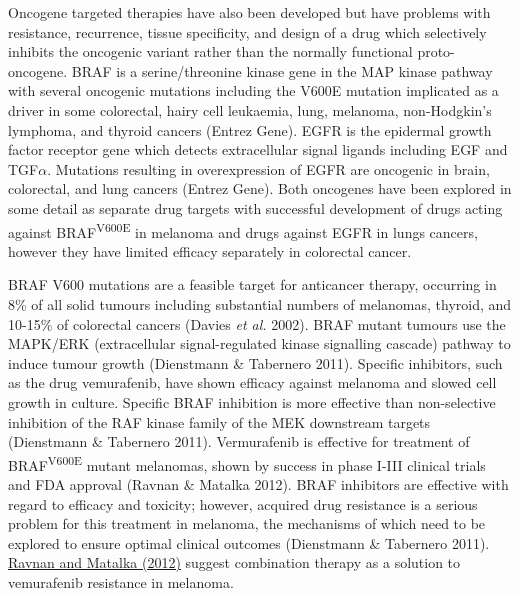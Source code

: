 Oncogene targeted therapies have also been developed but have problems
with resistance, recurrence, tissue specificity, and design of a drug
which selectively inhibits the oncogenic variant rather than the
normally functional proto-oncogene. BRAF is a serine/threonine kinase
gene in the MAP kinase pathway with several oncogenic mutations
including the V600E mutation implicated as a driver in some colorectal,
hairy cell leukaemia, lung, melanoma, non-Hodgkin{\textquoteright}s
lymphoma, and thyroid cancers (Entrez Gene). EGFR is the epidermal
growth factor receptor gene which detects extracellular signal ligands
including EGF and TGF$\alpha $. Mutations resulting in overexpression
of EGFR are oncogenic in brain, colorectal, and lung cancers (Entrez
Gene). Both oncogenes have been explored in some detail as separate
drug targets with successful development of drugs acting against
BRAF\textsuperscript{V600E} in melanoma and drugs against EGFR in lungs
cancers, however they have limited efficacy separately in colorectal
cancer. 


BRAF V600 mutations are a feasible target for anticancer therapy,
occurring in 8\% of all solid tumours including substantial numbers of
melanomas, thyroid, and 10-15\% of colorectal cancers (Davies\textit{
et al.} 2002). BRAF mutant tumours use the MAPK/ERK (extracellular
signal-regulated kinase signalling cascade) pathway to induce tumour
growth (Dienstmann \& Tabernero 2011). Specific inhibitors, such as
the drug vemurafenib, have shown efficacy against melanoma and slowed
cell growth in culture. Specific BRAF inhibition is more effective
than non-selective inhibition of the RAF kinase family of the MEK
downstream targets (Dienstmann \& Tabernero 2011). Vermurafenib is
effective for treatment of BRAF\textsuperscript{V600E} mutant
melanomas, shown by success in phase I-III clinical trials and FDA
approval (Ravnan \& Matalka 2012). BRAF inhibitors are effective with
regard to efficacy and toxicity; however, acquired drug resistance is a
serious problem for this treatment in melanoma, the mechanisms of which
need to be explored to ensure optimal clinical outcomes (Dienstmann \&
Tabernero 2011). \hyperlink{ENREF82}{Ravnan and Matalka (2012)}
suggest combination therapy as a solution to vemurafenib resistance in
melanoma. 


